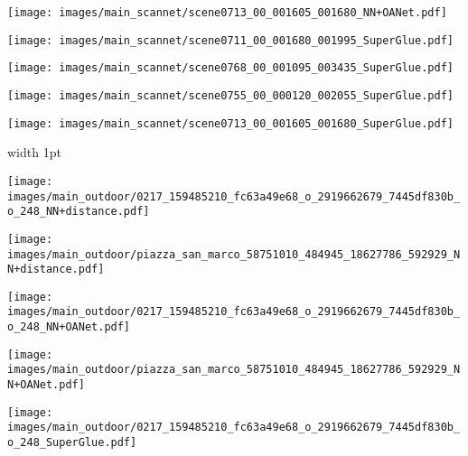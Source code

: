 \documentclass[10pt,twocolumn,letterpaper]{article}
\renewcommand{\*}[1]{\mathbf{#1}}
\newcommand{\0}{\phantom{0}}
\begin{document}
\begin{figure*}[ht!]
\begin{minipage}{0.32\textwidth}
    \vspace{.5mm}
    \texttt{[image: images/main\_scannet/scene0713\_00\_001605\_001680\_NN+OANet.pdf]}
\end{minipage}\hspace{1mm}\begin{minipage}{0.32\textwidth}
    \texttt{[image: images/main\_scannet/scene0711\_00\_001680\_001995\_SuperGlue.pdf]}
    
    \vspace{.5mm}
    \texttt{[image: images/main\_scannet/scene0768\_00\_001095\_003435\_SuperGlue.pdf]}

    \vspace{.5mm}
    \texttt{[image: images/main\_scannet/scene0755\_00\_000120\_002055\_SuperGlue.pdf]}
    
    \vspace{.5mm}
    \texttt{[image: images/main\_scannet/scene0713\_00\_001605\_001680\_SuperGlue.pdf]}
\end{minipage}

\vspace{1.5mm}
\begin{minipage}{0.02\textwidth}
\end{minipage}\hfill{\vline width 1pt}\hfill
\hspace{1mm}\begin{minipage}{0.32\textwidth}
    \texttt{[image: images/main\_outdoor/0217\_159485210\_fc63a49e68\_o\_2919662679\_7445df830b\_o\_248\_NN+distance.pdf]}
    
    \vspace{.5mm}
    \texttt{[image: images/main\_outdoor/piazza\_san\_marco\_58751010\_484945\_18627786\_592929\_NN+distance.pdf]}
\end{minipage}\hspace{1mm}\begin{minipage}{0.32\textwidth}
    \texttt{[image: images/main\_outdoor/0217\_159485210\_fc63a49e68\_o\_2919662679\_7445df830b\_o\_248\_NN+OANet.pdf]}
    
    \vspace{.5mm}
    \texttt{[image: images/main\_outdoor/piazza\_san\_marco\_58751010\_484945\_18627786\_592929\_NN+OANet.pdf]}
\end{minipage}\hspace{1mm}\begin{minipage}{0.32\textwidth}
    \texttt{[image: images/main\_outdoor/0217\_159485210\_fc63a49e68\_o\_2919662679\_7445df830b\_o\_248\_SuperGlue.pdf]}
    

\end{minipage}
\end{figure*}
\end{document}
